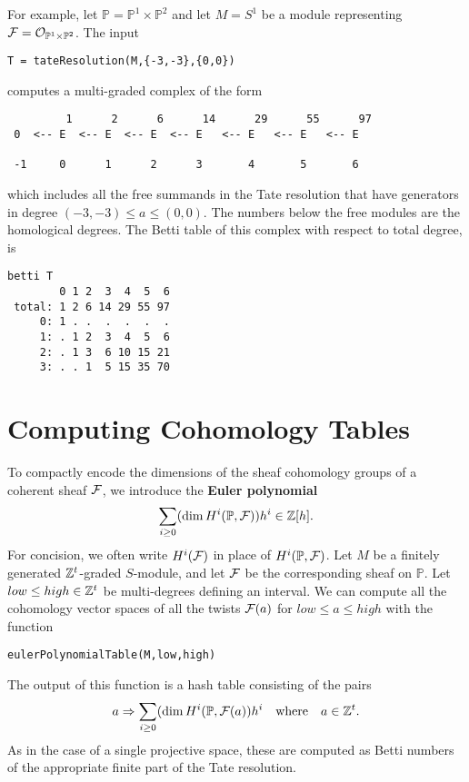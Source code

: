 \documentclass[twoside,12pt, leqno]{amsart}
\def\PP{{\mathbb P}}
\begin{document}
For example, let $\PP=\PP^1\times \PP^2$ and let $M=S^1$ be a module representing $\sF=\cO_{\PP^1\times \PP^2}$.  The input
\begin{verbatim}
T = tateResolution(M,{-3,-3},{0,0})
\end{verbatim}
computes a multi-graded complex of the form
{\small \begin{verbatim}
         1      2      6      14      29      55      97
 0  <-- E  <-- E  <-- E  <-- E   <-- E   <-- E   <-- E 
                                                                  
 -1     0      1      2      3       4       5       6  
\end{verbatim}}
\noindent which includes all the free summands in the Tate resolution that have generators in degree $(-3,-3)\leq a\leq (0,0)$. The numbers below the free modules are the homological degrees.
The Betti table of this complex with respect to total degree, is
\goodbreak
{\small \begin{verbatim}
betti T
        0 1 2  3  4  5  6
 total: 1 2 6 14 29 55 97
     0: 1 . .  .  .  .  .
     1: . 1 2  3  4  5  6
     2: . 1 3  6 10 15 21
     3: . . 1  5 15 35 70
\end{verbatim}}

\section{Computing Cohomology Tables}\label{sec:cohom tables}
To compactly encode the dimensions of the sheaf cohomology groups of a coherent sheaf ${\mathcal F}$, we introduce the {\bf Euler polynomial}
$$
\sum_{i\geq 0} (\dim H^i(\PP, \sF))h^i\in \ZZ[h].
$$
For concision, we often write $H^i({\mathcal F})$ in place of $H^i(\PP, \sF)$.
Let $M$ be a finitely generated ${\mathbb Z}^t$-graded $S$-module, and let ${\mathcal F}$ be the 
corresponding sheaf on $\PP$. Let
$low\leq high\in {\mathbb Z}^t$ be multi-degrees defining an interval. We can compute
all the cohomology vector spaces of all the twists ${\mathcal F}(a)$ for $low\leq a\leq high$ with the function 
{\small \begin{verbatim}
eulerPolynomialTable(M,low,high)
\end{verbatim}}
The output of this function is a hash table consisting of the pairs
$$ 
a \Rightarrow \sum_{i\geq 0} (\dim H^i(\PP, \sF(a))h^i \ \  \text{ where }\ \  a\in \ZZ^t.
$$
As in the case of a single projective space, these are computed as Betti numbers of the appropriate finite  part of the Tate resolution.
\end{document}
